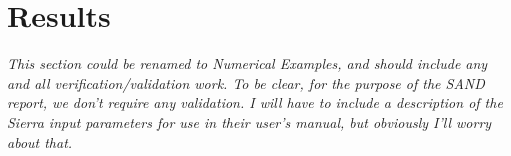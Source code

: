 \chapter{Results}
\label{results}

\textit{This section could be renamed to Numerical Examples, and
  should include any and all verification/validation work. To be
  clear, for the purpose of the SAND report, we don't require any
  validation. I will have to include a description of the Sierra input
  parameters for use in their user's manual, but obviously I'll worry
  about that.}

